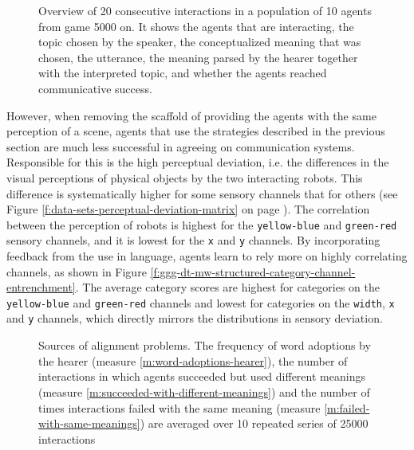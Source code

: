 \begin{figure}[p]
  \caption{Overview of 20 consecutive interactions in a population of
    10 agents from game 5000 on. It shows the agents that are
    interacting, the topic chosen by the speaker, the conceptualized
    meaning that was chosen, the utterance, the meaning parsed by the
    hearer together with the interpreted topic, and whether the agents
    reached communicative success.}
  \label{f:ggg-mw-structured-trace}
\end{figure}

\noindent However, when removing the scaffold of providing the agents
with the same perception of a scene, agents that use the strategies
described in the previous section are much less successful in agreeing
on communication systems. Responsible for this is the high perceptual
deviation, i.e. the differences in the visual perceptions of physical
objects by the two interacting robots. This difference is
systematically higher for some sensory channels that for others (see
Figure \ref{f:data-sets-perceptual-deviation-matrix} on page
\pageref{f:data-sets-perceptual-deviation-matrix}). The correlation
between the perception of robots is highest for the
\texttt{yellow-blue} and \texttt{green-red} sensory channels, and it
is lowest for the \texttt{x} and \texttt{y} channels. By incorporating
feedback from the use in language, agents learn to rely more on highly
correlating channels, as shown in Figure
\ref{f:ggg-dt-mw-structured-category-channel-entrenchment}. The
average category scores are highest for categories on the
\texttt{yellow-blue} and \texttt{green-red} channels and lowest for
categories on the \texttt{width}, \texttt{x} and \texttt{y} channels,
which directly mirrors the distributions in sensory deviation.


\begin{figure}[t]
  \caption{Sources of alignment problems. The frequency of word
    adoptions by the hearer (measure \ref{m:word-adoptions-hearer}),
    the number of interactions in which agents succeeded but used
    different meanings (measure
    \ref{m:succeeded-with-different-meanings}) and the number of times
    interactions failed with the same meaning (measure
    \ref{m:failed-with-same-meanings}) are averaged over 10 repeated
    series of 25000 interactions}
  \label{f:ggg-dt-mw-structured-problems}
\end{figure}


